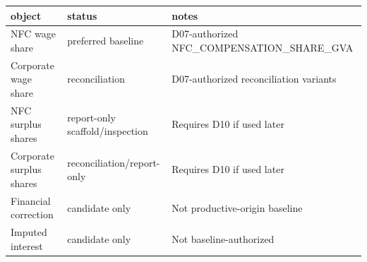 
\begin{tabular}{lll}
\toprule
object & status & notes\\
\midrule
NFC wage share & preferred baseline & D07-authorized NFC\_COMPENSATION\_SHARE\_GVA\\
Corporate wage share & reconciliation & D07-authorized reconciliation variants\\
NFC surplus shares & report-only scaffold/inspection & Requires D10 if used later\\
Corporate surplus shares & reconciliation/report-only & Requires D10 if used later\\
Financial correction & candidate only & Not productive-origin baseline\\
\addlinespace
Imputed interest & candidate only & Not baseline-authorized\\
\bottomrule
\end{tabular}
